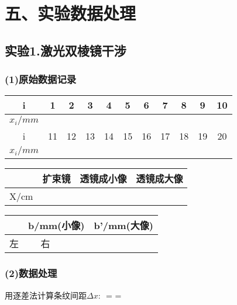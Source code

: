 \documentclass[11pt,a4paper,oneside]{article}
\begin{document}
\section*{五、实验数据处理}
\subsection*{实验1.激光双棱镜干涉}
\subsubsection*{(1)原始数据记录}

\begin{center}
\begin{table}[htbp]
\begin{tabular}{|c|c|c|c|c|c|c|c|c|c|c|}
\hline
i & 1 & 2 & 3 & 4 & 5 & 6 & 7 & 8 & 9 & 10
\\
\hline
$x_i/mm$
{%
{%
&%
{%
{%
\\
\hline
i & 11 & 12 & 13 & 14 & 15 & 16 & 17 & 18 & 19 & 20
\\
\hline
$x_i/mm$
{%
{%
&%
{%
{%
\\
\hline
\end{tabular}
\end{table}
\begin{table}[htbp]
\begin{tabular}{|c|c|c|c|}
\hline
   & 扩束镜 & 透镜成小像 & 透镜成大像 \\
\hline
X/cm
{%
&%
{%
\\
\hline
\end{tabular}
\end{table}
\begin{table}[htbp]
\begin{tabular}{|c|c|c|c|c|}
\hline
 & \multicolumn{2}{|c|}{b/mm(小像) }& \multicolumn{2}{|c|}{b'/mm(大像)} \\
\hline
左 & %
\hline
右 & %
\hline
\end{tabular}
\end{table}
\end{center}

\subsubsection*{(2)数据处理}
用逐差法计算条纹间距${\Delta}x$:
$$ = \displaystyle{} = %
\end{document}
